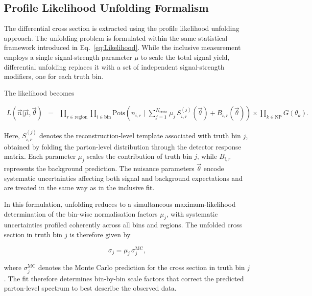 \subsection{Profile Likelihood Unfolding Formalism}

The differential cross section is extracted using the profile likelihood unfolding approach. 
The unfolding problem is formulated within the same statistical framework introduced in Eq.~\ref{eq:Likelihood}. 
While the inclusive measurement employs a single signal-strength parameter $\mu$ to scale the total signal yield, differential unfolding replaces it with a set of independent signal-strength modifiers, one for each truth bin.

The likelihood becomes

\begin{eqnarray}
    L\left(\vec{n}|\vec{\mu}, \vec{\theta}\right) 
    &=& 
    \prod_{r \in \text{region}}
    \prod_{i\in \text{bin}} 
    \text{Pois}\left(n_{i,r} \mid 
    \sum_{j=1}^{N_\text{truth}}
    \mu_j \, S_{i,r}^{(j)}(\vec{\theta})
    + B_{i,r}(\vec{\theta})\right)
    \times
    \prod_{k\in \text{NP}}
    G\left(\theta_k\right).
\end{eqnarray}\label{eq:PLU_Likelihood}

Here, $S_{i,r}^{(j)}$ denotes the reconstruction-level template associated with truth bin $j$, obtained by folding the parton-level distribution through the detector response matrix. 
Each parameter $\mu_j$ scales the contribution of truth bin $j$, while $B_{i,r}$ represents the background prediction. 
The nuisance parameters $\vec{\theta}$ encode systematic uncertainties affecting both signal and background expectations and are treated in the same way as in the inclusive fit.

In this formulation, unfolding reduces to a simultaneous maximum-likelihood determination of the bin-wise normalisation factors $\mu_j$, with systematic uncertainties profiled coherently across all bins and regions. 
The unfolded cross section in truth bin $j$ is therefore given by

\begin{equation}
\sigma_j = \mu_j \, \sigma_j^{\text{MC}},
\end{equation}

where $\sigma_j^{\text{MC}}$ denotes the Monte Carlo prediction for the cross section in truth bin $j$. 
The fit therefore determines bin-by-bin scale factors that correct the predicted parton-level spectrum to best describe the observed data.

